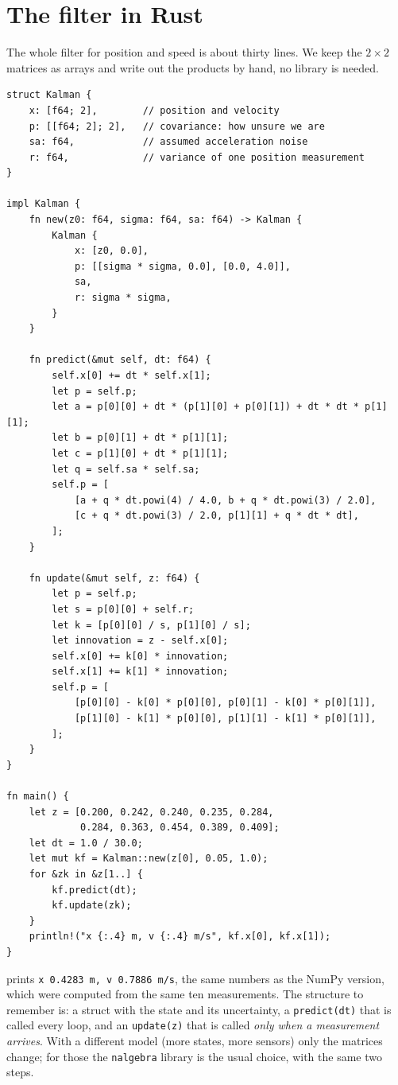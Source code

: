 \section*{The filter in Rust}
The whole filter for position and speed is about thirty lines. We keep the $2\times2$ matrices as arrays and write out the products by hand, no library is needed.
\begin{verbatim}
struct Kalman {
    x: [f64; 2],        // position and velocity
    p: [[f64; 2]; 2],   // covariance: how unsure we are
    sa: f64,            // assumed acceleration noise
    r: f64,             // variance of one position measurement
}

impl Kalman {
    fn new(z0: f64, sigma: f64, sa: f64) -> Kalman {
        Kalman {
            x: [z0, 0.0],
            p: [[sigma * sigma, 0.0], [0.0, 4.0]],
            sa,
            r: sigma * sigma,
        }
    }

    fn predict(&mut self, dt: f64) {
        self.x[0] += dt * self.x[1];
        let p = self.p;
        let a = p[0][0] + dt * (p[1][0] + p[0][1]) + dt * dt * p[1][1];
        let b = p[0][1] + dt * p[1][1];
        let c = p[1][0] + dt * p[1][1];
        let q = self.sa * self.sa;
        self.p = [
            [a + q * dt.powi(4) / 4.0, b + q * dt.powi(3) / 2.0],
            [c + q * dt.powi(3) / 2.0, p[1][1] + q * dt * dt],
        ];
    }

    fn update(&mut self, z: f64) {
        let p = self.p;
        let s = p[0][0] + self.r;
        let k = [p[0][0] / s, p[1][0] / s];
        let innovation = z - self.x[0];
        self.x[0] += k[0] * innovation;
        self.x[1] += k[1] * innovation;
        self.p = [
            [p[0][0] - k[0] * p[0][0], p[0][1] - k[0] * p[0][1]],
            [p[1][0] - k[1] * p[0][0], p[1][1] - k[1] * p[0][1]],
        ];
    }
}

fn main() {
    let z = [0.200, 0.242, 0.240, 0.235, 0.284,
             0.284, 0.363, 0.454, 0.389, 0.409];
    let dt = 1.0 / 30.0;
    let mut kf = Kalman::new(z[0], 0.05, 1.0);
    for &zk in &z[1..] {
        kf.predict(dt);
        kf.update(zk);
    }
    println!("x {:.4} m, v {:.4} m/s", kf.x[0], kf.x[1]);
}
\end{verbatim}
prints \verb!x 0.4283 m, v 0.7886 m/s!, the same numbers as the NumPy version, which were computed from the same ten measurements. The structure to remember is: a struct with the state and its uncertainty, a \verb!predict(dt)! that is called every loop, and an \verb!update(z)! that is called \emph{only when a measurement arrives}. With a different model (more states, more sensors) only the matrices change; for those the \verb!nalgebra! library is the usual choice, with the same two steps.


